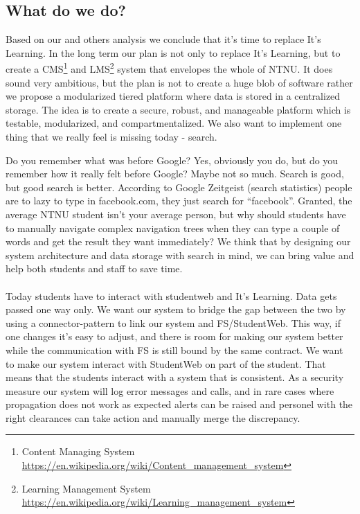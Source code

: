 \subsection{What do we do?}
Based on our and others analysis we conclude that it's time to replace It's Learning. In the long term our plan is not only to replace It's Learning, but to create
a CMS\footnote{Content Managing System \url{https://en.wikipedia.org/wiki/Content_management_system}} and LMS\footnote{Learning Management System \url{https://en.wikipedia.org/wiki/Learning_management_system}} system that envelopes the whole of NTNU. It does sound very ambitious, but the plan is not to create a huge blob of software rather we propose a modularized tiered 
platform where data is stored in a centralized storage. The idea is to create a secure, robust, and manageable platform which is testable, modularized, and compartmentalized.
We also want to implement one thing that we really feel is missing today - search. 


Do you remember what was before Google? Yes, obviously you do, but do you remember how it really felt before Google? Maybe not so much. Search is good, but good search is better. 
According to Google Zeitgeist (search statistics) \cite{google:zeitgeist} people are to lazy to type in facebook.com, they just search for ``facebook''. Granted, the average NTNU 
student isn't your average person, but why should students have to manually navigate complex navigation trees when they can type a couple of words and get the result they want 
immediately? We think that by designing our system architecture and data storage with search in mind, we can bring value and help both students and staff to save time. 
\\\\
Today students have to interact with studentweb and It's Learning. Data gets passed one way only. We want our system to bridge the gap between the two by using a 
connector-pattern %
to link our system and FS/StudentWeb. This way, if one changes it's easy to adjust, and there is room for making our system better while the communication with FS is still bound by 
the same contract. We want to make our system interact with StudentWeb on part of the student. That means that the students interact with a system that is consistent. As a security 
measure our system will log error messages and calls, and in rare cases where propagation does not work as expected alerts can be raised and personel with the right clearances can 
take action and manually merge the discrepancy. %


